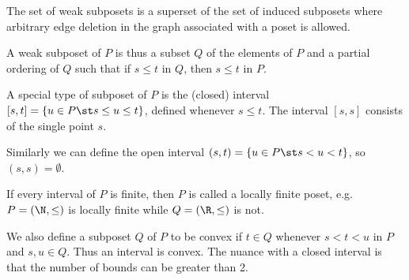 
The set of weak subposets is a superset of the set of induced subposets where
arbitrary edge deletion in the graph associated with a poset is allowed.


A weak subposet of $P$ is thus a subset $Q$ of the elements of $P$ and a
partial ordering of $Q$ such that if $s \leq t$ in $Q$, then $s \leq t$ in $P$.



A special type of subposet of $P$ is the (closed) interval $[s, t] = \left\{{u
\in P \st s \leq u \leq t}\right\}$, defined whenever $s \leq t$. The interval
$[s, s]$ consists of the single point $s$.


Similarly we can define the open interval $(s, t) = \left\{{u \in P \st s < u <
t}\right\}$, so $(s, s) = \emptyset$.

If every interval of $P$ is finite, then $P$ is called a locally finite poset,
e.g. $P = (\N, \le)$ is locally finite while $Q = (\R, \le)$ is
not.


We also define a subposet $Q$ of $P$ to be convex if $t \in Q$ whenever $s < t
< u$ in $P$ and $s, u \in Q$. Thus an interval is convex. The nuance with a
closed interval is that the number of bounds can be greater than 2.

